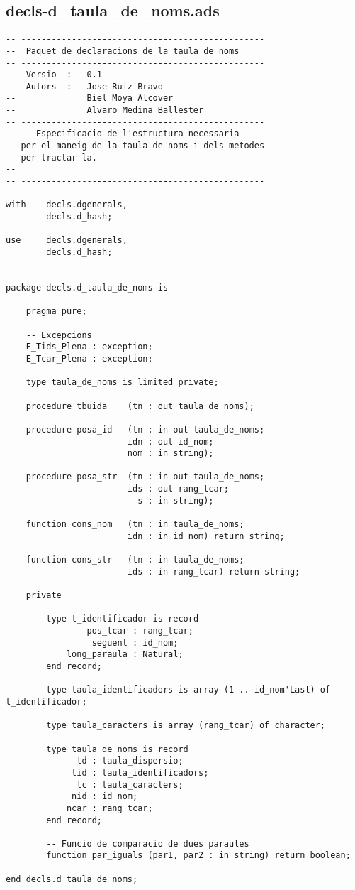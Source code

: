 \documentclass[10pt]{report}
\begin{document}
    \subsection{decls-d\_taula\_de\_noms.ads}
    \begin{lstlisting}[style=Ada]
-- ------------------------------------------------
--  Paquet de declaracions de la taula de noms
-- ------------------------------------------------
--  Versio  :   0.1
--  Autors  :   Jose Ruiz Bravo
--              Biel Moya Alcover
--              Alvaro Medina Ballester
-- ------------------------------------------------
--    Especificacio de l'estructura necessaria
-- per el maneig de la taula de noms i dels metodes
-- per tractar-la.
--
-- ------------------------------------------------

with    decls.dgenerals,
        decls.d_hash; 
        
use     decls.dgenerals,
        decls.d_hash;


package decls.d_taula_de_noms is

    pragma pure;
    
    -- Excepcions
    E_Tids_Plena : exception;
    E_Tcar_Plena : exception;
    
    type taula_de_noms is limited private;
    
    procedure tbuida    (tn : out taula_de_noms);
    
    procedure posa_id   (tn : in out taula_de_noms;  
                        idn : out id_nom; 
                        nom : in string);
    
    procedure posa_str  (tn : in out taula_de_noms;
                        ids : out rang_tcar;
                          s : in string);
                        
    function cons_nom   (tn : in taula_de_noms; 
                        idn : in id_nom) return string;
    
    function cons_str   (tn : in taula_de_noms; 
                        ids : in rang_tcar) return string;   
    
    private
        
        type t_identificador is record 
                pos_tcar : rang_tcar;
                 seguent : id_nom;
            long_paraula : Natural;
        end record;
        
        type taula_identificadors is array (1 .. id_nom'Last) of t_identificador;
        
        type taula_caracters is array (rang_tcar) of character;
        
        type taula_de_noms is record
              td : taula_dispersio;
             tid : taula_identificadors;
              tc : taula_caracters;
             nid : id_nom;
            ncar : rang_tcar;
        end record;
        
        -- Funcio de comparacio de dues paraules
        function par_iguals (par1, par2 : in string) return boolean;        
                    
end decls.d_taula_de_noms;        
    \end{lstlisting}
    
\end{document}
